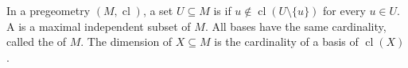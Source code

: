 In a pregeometry $(M, \operatorname{cl})$, a set $U \subseteq M$ is  if $u \notin \operatorname{cl}(U \setminus \{u\})$ for every $u \in U$. A  is a maximal independent subset of $M$. All bases have the same cardinality, called the  of $M$. The dimension of $X \subseteq M$ is the cardinality of a basis of $\operatorname{cl}(X)$.
